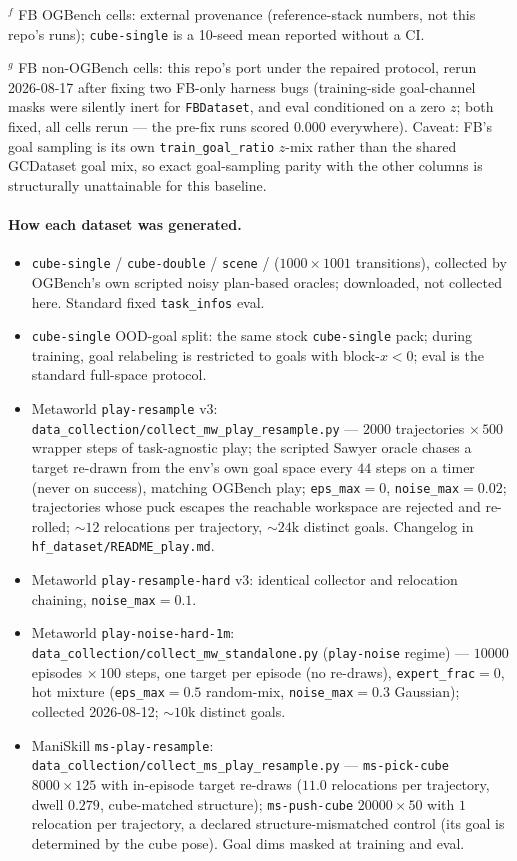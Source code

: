 \documentclass[10pt]{article}
\begin{document}
$^{f}$ FB OGBench cells: external provenance (reference-stack numbers, not this repo's
runs); \texttt{cube-single} is a 10-seed mean reported without a CI.

$^{g}$ FB non-OGBench cells: this repo's port under the repaired protocol, rerun 2026-08-17
after fixing two FB-only harness bugs (training-side goal-channel masks were silently inert
for \texttt{FBDataset}, and eval conditioned on a zero $z$; both fixed, all cells rerun ---
the pre-fix runs scored $0.000$ everywhere). Caveat: FB's goal sampling is its own
\texttt{train\_goal\_ratio} $z$-mix rather than the shared GCDataset goal mix, so exact
goal-sampling parity with the other columns is structurally unattainable for this baseline.

\paragraph{How each dataset was generated.}
\begin{itemize}
\item \texttt{cube-single} / \texttt{cube-double} / \texttt{scene} /
($1000\times1001$ transitions), collected by OGBench's own scripted noisy plan-based
oracles; downloaded, not collected here. Standard fixed \texttt{task\_infos} eval.
\item \texttt{cube-single} OOD-goal split: the same stock \texttt{cube-single} pack;
during training, goal relabeling is restricted to goals with block-$x<0$; eval is the
standard full-space protocol.
\item Metaworld \texttt{play-resample} v3:
\texttt{data\_collection/collect\_mw\_play\_resample.py} --- $2000$ trajectories
$\times\,500$ wrapper steps of task-agnostic play; the scripted Sawyer oracle chases a
target re-drawn from the env's own goal space every $44$ steps on a timer (never on
success), matching OGBench play; \texttt{eps\_max}$=0$, \texttt{noise\_max}$=0.02$;
trajectories whose puck escapes the reachable workspace are rejected and re-rolled;
${\sim}12$ relocations per trajectory, ${\sim}24$k distinct goals. Changelog in
\texttt{hf\_dataset/README\_play.md}.
\item Metaworld \texttt{play-resample-hard} v3: identical collector and relocation
chaining, \texttt{noise\_max}$=0.1$.
\item Metaworld \texttt{play-noise-hard-1m}:
\texttt{data\_collection/collect\_mw\_standalone.py} (\texttt{play-noise} regime) ---
$10000$ episodes $\times\,100$ steps, one target per episode (no re-draws),
\texttt{expert\_frac}$=0$, hot mixture (\texttt{eps\_max}$=0.5$ random-mix,
\texttt{noise\_max}$=0.3$ Gaussian); collected 2026-08-12; ${\sim}10$k distinct goals.
\item ManiSkill \texttt{ms-play-resample}:
\texttt{data\_collection/collect\_ms\_play\_resample.py} --- \texttt{ms-pick-cube}
$8000\times125$ with in-episode target re-draws ($11.0$ relocations per trajectory, dwell
$0.279$, cube-matched structure); \texttt{ms-push-cube} $20000\times50$ with $1$
relocation per trajectory, a declared structure-mismatched control (its goal is determined
by the cube pose). Goal dims masked at training and eval.
\end{itemize}
\end{document}
